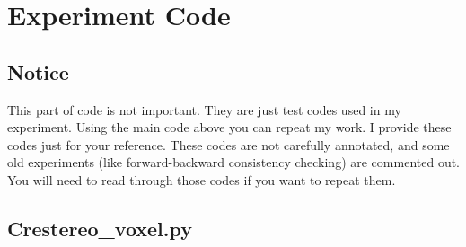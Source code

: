 \section*{Experiment Code}
\subsection*{Notice}
This part of code is not important. They are just test codes used in my experiment. Using the main code above you can repeat my work. I provide these codes just for your reference. These codes are not carefully annotated, and some old experiments (like forward-backward consistency checking) are commented out. You will need to read through those codes if you want to repeat them.
\subsection*{Crestereo_voxel.py}

